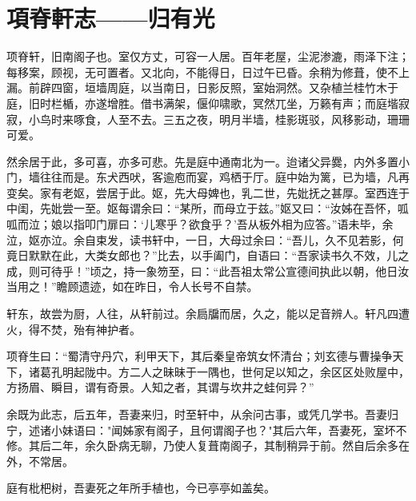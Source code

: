 \section{ 項脊軒志——归有光}

项脊轩，旧南阁子也。室仅方丈，可容一人居。百年老屋，尘泥渗漉，雨泽下注；每移案，顾视，无可置者。又北向，不能得日，日过午已昏。余稍为修葺，使不上漏。前辟四窗，垣墙周庭，以当南日，日影反照，室始洞然。又杂植兰桂竹木于庭，旧时栏楯，亦遂增胜。借书满架，偃仰啸歌，冥然兀坐，万籁有声；而庭堦寂寂，小鸟时来啄食，人至不去。三五之夜，明月半墙，桂影斑驳，风移影动，珊珊可爱。

然余居于此，多可喜，亦多可悲。先是庭中通南北为一。迨诸父异爨，内外多置小门，墙往往而是。东犬西吠，客逾庖而宴，鸡栖于厅。庭中始为篱，已为墙，凡再变矣。家有老妪，尝居于此。妪，先大母婢也，乳二世，先妣抚之甚厚。室西连于中闺，先妣尝一至。妪每谓余曰：“某所，而母立于兹。”妪又曰：“汝姊在吾怀，呱呱而泣；娘以指叩门扉曰：‘儿寒乎？欲食乎？’吾从板外相为应答。”语未毕，余泣，妪亦泣。余自束发，读书轩中，一日，大母过余曰：“吾儿，久不见若影，何竟日默默在此，大类女郎也？”比去，以手阖门，自语曰：“吾家读书久不效，儿之成，则可待乎！”顷之，持一象笏至，曰：“此吾祖太常公宣德间执此以朝，他日汝当用之！”瞻顾遗迹，如在昨日，令人长号不自禁。

轩东，故尝为厨，人往，从轩前过。余扃牖而居，久之，能以足音辨人。轩凡四遭火，得不焚，殆有神护者。

项脊生曰：“蜀清守丹穴，利甲天下，其后秦皇帝筑女怀清台；刘玄德与曹操争天下，诸葛孔明起陇中。方二人之昧昧于一隅也，世何足以知之，余区区处败屋中，方扬眉、瞬目，谓有奇景。人知之者，其谓与坎井之蛙何异？”

余既为此志，后五年，吾妻来归，时至轩中，从余问古事，或凭几学书。吾妻归宁，述诸小妹语曰："闻姊家有阁子，且何谓阁子也？"其后六年，吾妻死，室坏不修。其后二年，余久卧病无聊，乃使人复葺南阁子，其制稍异于前。然自后余多在外，不常居。

庭有枇杷树，吾妻死之年所手植也，今已亭亭如盖矣。
